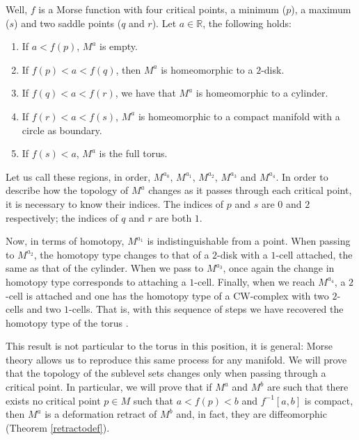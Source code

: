 Well, $f$ is a Morse function with four critical points, a minimum ($p$), a maximum ($s$) and two saddle points ($q$ and $r$). Let $a\in\mathbb{R}$, the following holds:
\begin{enumerate}[label=(\roman*), noitemsep]
    \item If $a<f(p)$, $M^a$ is empty.
    \item If $f(p)< a< f(q)$, then $M^a$ is homeomorphic to a $2$-disk.
    \item If $f(q)<a<f(r)$, we have that $M^a$ is homeomorphic to a cylinder.
    \item If $f(r)<a<f(s)$, $M^a$ is homeomorphic to a compact manifold with a circle as boundary.
    \item If $f(s)<a$, $M^a$ is the full torus.
\end{enumerate}
Let us call these regions, in order, $M^{a_0}$, $M^{a_1}$, $M^{a_2}$, $M^{a_3}$ and $M^{a_4}$. In order to describe how the topology of $M^a$ changes as it passes through each critical point, it is necessary to know their indices. The indices of $p$ and $s$ are $0$ and $2$ respectively; the indices of $q$ and $r$ are both $1$.

Now, in terms of homotopy, $M^{a_1}$ is indistinguishable from a point. When passing to $M^{a_2}$, the homotopy type changes to that of a $2$-disk with a $1$-cell attached, the same as that of the cylinder. When we pass to $M^{a_3}$, once again the change in homotopy type corresponds to attaching a $1$-cell. Finally, when we reach $M^{a_4}$, a $2$-cell is attached and one has the homotopy type of a CW-complex with two $2$-cells and two $1$-cells. That is, with this sequence of steps we have recovered the homotopy type of the torus \cite{milnor1963} \cite{bott1988morse}. %

This result is not particular to the torus in this position, it is general: Morse theory allows us to reproduce this same process for any manifold. We will prove that the topology of the sublevel sets changes only when passing through a critical point. In particular, we will prove that if $M^a$ and $M^b$ are such that there exists no critical point $p\in M$ such that $a<f(p)<b$ and $f^{-1}[a,b]$ is compact, then $M^a$ is a deformation retract of $M^b$ and, in fact, they are diffeomorphic (Theorem \ref{retractodef}). %

